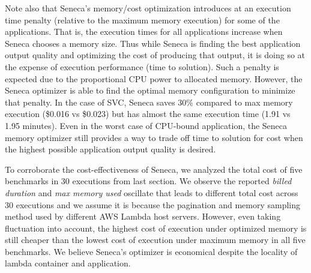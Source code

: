Note also that Seneca's memory/cost optimization
introduces at an execution time penalty (relative to the maximum memory
execution) for some of the applications.  That is, the
execution times for all applications increase when Seneca chooses
a memory size.  Thus while Seneca is finding the best application output
quality and optimizing the cost of producing that output, it is doing so at
the expense of execution performance (time to solution). Such a penalty
is expected due to the proportional CPU power to allocated
memory. However, the Seneca optimizer is able to find the optimal
memory configuration to minimize that  penalty. In the case of SVC, Seneca saves 30\% compared to max memory execution (\$0.016 vs \$0.023) but has almost the same execution time (1.91 vs 1.95 minutes).
Even in the worst case of CPU-bound application, the Seneca memory optimizer still provides a way to trade off time to solution for cost when the highest possible application output quality is desired.

To corroborate the cost-effectiveness of Seneca, we analyzed the total cost of five benchmarks in 30 executions from last section. We observe the reported \textit{billed duration} and \textit{max memory used} oscillate that leads to different total cost across 30 executions and we assume it is because the pagination and memory sampling method used by different AWS Lambda host servers. However, even taking fluctuation into account, the highest cost of execution under optimized memory is still cheaper than the lowest cost of execution under maximum memory in all five benchmarks. We believe Seneca's optimizer is economical despite the locality of lambda container and application.







